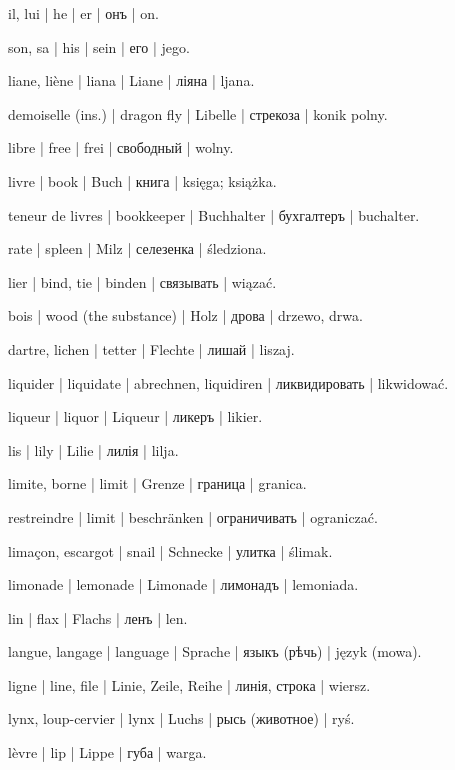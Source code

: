 \begin{outdent}{1em}
il, lui | he | er | онъ | on.

\uvsubentry{}
son, sa | his | sein | его | jego.

liane, liène | liana | Liane | ліяна | ljana.

demoiselle (ins.) | dragon fly | Libelle | стрекоза | konik
polny.

libre | free | frei | свободный | wolny.

livre | book | Buch | книга | księga; książka.

\uvsubentry{}
teneur de livres | bookkeeper | Buchhalter | бухгалтеръ | buchalter.

rate | spleen | Milz | селезенка | śledziona.

lier | bind, tie | binden | связывать | wiązać.

bois | wood (the substance) | Holz | дрова | drzewo, drwa.

dartre, lichen | tetter | Flechte | лишай | liszaj.

liquider | liquidate | abrechnen, liquidiren | ликвидировать | likwidować.

liqueur | liquor | Liqueur | ликеръ | likier.

lis | lily | Lilie | лилія | lilja.

limite, borne | limit | Grenze | граница | granica.

\uvsubentry{}
restreindre | limit | beschränken | ограничивать | ograniczać.

limaçon, escargot | snail | Schnecke | улитка | ślimak.

limonade | lemonade | Limonade | лимонадъ | lemoniada.

lin | flax | Flachs | ленъ | len.

langue, langage | language | Sprache | языкъ (рѣчь) | język
(mowa).

ligne | line, file | Linie, Zeile, Reihe | линія, строка | wiersz.

lynx, loup-cervier | lynx | Luchs | рысь (животное) | ryś.

lèvre | lip | Lippe | губа | warga.


\end{outdent}
